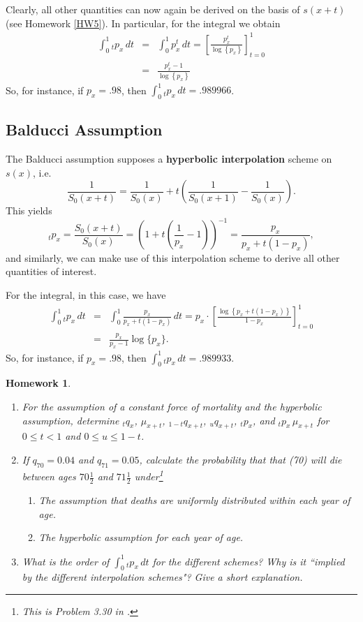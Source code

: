 \documentclass[11pt,fleqn,oneside]{book}
\newtheorem{homework}{Homework}
\begin{document}
Clearly, all other quantities can now again be derived on the basis of $s(x+t)$ (see Homework \ref{HW5}). In particular, for the integral we obtain
\begin{eqnarray*}
\int_0^1 {_tp_x}\,dt &=& \int_0^1 p_x^t\,dt = \left[\frac{p_x^t}{\log\left\{p_x\right\}}\right]_{t=0}^{1} \\
&=& \frac{p_x^t - 1}{\log\left\{p_x\right\}}
\end{eqnarray*}
So, for instance, if $p_x = .98$, then $\int_0^1 {_tp_x}\,dt = .989966$.

\subsection*{Balducci Assumption}
The Balducci assumption supposes a \textbf{hyperbolic interpolation} scheme on $s(x)$, i.e.\
$$
\frac{1}{S_0(x+t)} = \frac{1}{S_0(x)} + t\left(\frac{1}{S_0(x+1)} -\frac{1}{S_0(x)} \right).
$$ 
This yields
$$
{_tp_x} = \frac{S_0(x+t)}{S_0(x)} = \left(1 + t(\frac{1}{p_x} - 1)\right)^{-1} = \frac{p_x}{p_x + t(1-p_x)},
$$
and similarly, we can make use of this interpolation scheme to derive all other quantities of interest.

For the integral, in this case, we have
\begin{eqnarray*}
\int_0^1 {_tp_x}\,dt &=& \int_0^1 \frac{p_x}{p_x + t(1-p_x)}\,dt = p_x \cdot \left[\frac{\log\left\{p_x + t(1-p_x)\right\}}{1-p_x}\right]_{t=0}^{1} \\
&=& \frac{p_x}{p_x - 1} \log\{p_x\}.
\end{eqnarray*}
So, for instance, if $p_x = .98$, then $\int_0^1 {_tp_x}\,dt = .989933$.

\begin{homework}
\label{HW8}
\begin{enumerate}
\item For the assumption of a constant force of mortality and the hyperbolic assumption, determine $_tq_x$, $\mu_{x+t}$, $_{1-t}q_{x+t}$, $_{u}q_{x+t}$, $_tp_x$, and ${_tp_x}\,\mu_{x+t}$ for $0\leq t <1$ and $0 \leq u \leq 1-t$.
\item If $q_{70}=0.04$ and $q_{71}=0.05$, calculate the probability that that (70) will die between ages $70\frac{1}{2}$ and $71\frac{1}{2}$ under\footnote{This is Problem 3.30 in \cite{BOWERS}.} 
\begin{enumerate}
\item The assumption that deaths are uniformly distributed within each year of age.
\item The hyperbolic assumption for each year of age. 
\end{enumerate} 
\item What is the order of $\int_0^1 {_tp_x}\,dt$ for the different schemes? Why is it ``implied by the different interpolation schemes"? Give a short explanation. 
\end{enumerate}
\end{homework}
\end{document}
